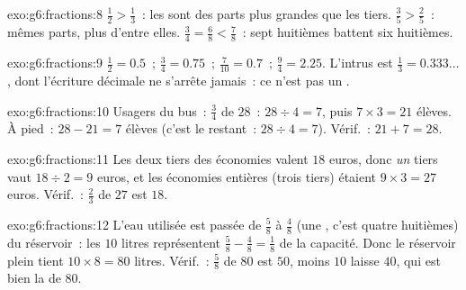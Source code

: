 \begin{solution}{exo:g6:fractions:8}
$\frac12 > \frac13$~: les  sont des parts plus grandes que les
tiers. $\frac35 > \frac25$~: mêmes parts, plus d'entre elles.
$\frac34 = \frac68 < \frac78$~: sept huitièmes battent six huitièmes.
\end{solution}

\begin{solution}{exo:g6:fractions:9}
$\frac12 = 0.5$~; \quad $\frac34 = 0.75$~; \quad
$\frac{7}{10} = 0.7$~; \quad $\frac94 = 2.25$. L'intrus est
$\frac13 = 0.333\dots$, dont l'écriture décimale ne s'arrête jamais~:
ce n'est pas un .
\end{solution}

\begin{solution}{exo:g6:fractions:10}
Usagers du bus~: $\frac34$ de $28$~: $28 \div 4 = 7$, puis
$7 \times 3 = 21$ élèves. À pied~: $28 - 21 = 7$ élèves (c'est le
 restant~: $28 \div 4 = 7$). Vérif.~: $21 + 7 = 28$.
\end{solution}

\begin{solution}{exo:g6:fractions:11}
Les deux tiers des économies valent $18$ euros, donc \emph{un} tiers
vaut $18 \div 2 = 9$ euros, et les économies entières (trois tiers)
étaient $9 \times 3 = 27$ euros. Vérif.~: $\frac23$ de $27$ est $18$.
\end{solution}

\begin{solution}{exo:g6:fractions:12}
L'eau utilisée est passée de $\frac58$ à $\frac48$ (une , c'est
quatre huitièmes) du réservoir~: les $10$ litres représentent
$\frac58 - \frac48 = \frac18$ de la capacité. Donc le réservoir plein
tient $10 \times 8 = 80$ litres. Vérif.~: $\frac58$ de $80$ est $50$,
moins $10$ laisse $40$, qui est bien la  de $80$.
\end{solution}

